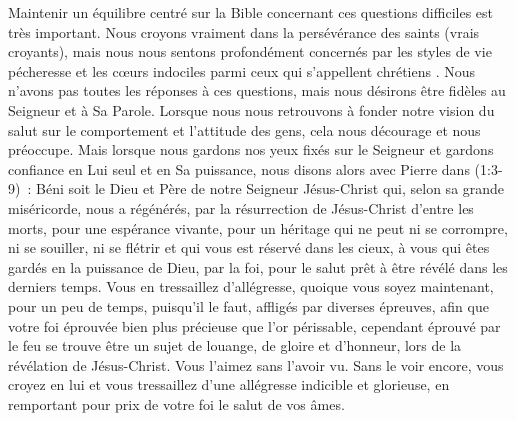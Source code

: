 \begin{enumerate}
\begin{pocketpar}{}
\begin{digestpar}{}
Maintenir un équilibre centré sur la Bible concernant ces questions difficiles est très important.
 Nous croyons vraiment dans la persévérance des saints (vrais croyants),
 mais nous nous sentons profondément concernés par les styles de vie pécheresse
 et les cœurs indociles parmi ceux qui s'appellent \og chrétiens \fg{}.
 Nous n'avons pas toutes les réponses à ces questions,
 mais nous désirons être fidèles au Seigneur et à Sa Parole.
 Lorsque nous nous retrouvons à fonder notre vision du salut
 sur le comportement et l'attitude des gens, cela nous
 décourage et nous préoccupe.
 Mais lorsque nous gardons nos yeux fixés sur le Seigneur et gardons confiance en Lui seul
 et en Sa puissance, nous disons alors avec Pierre dans
 (1:3-9)~:
 \og Béni soit le Dieu et Père de notre Seigneur Jésus-Christ qui,
 selon sa grande miséricorde, nous a régénérés, par la résurrection
 de Jésus-Christ d'entre les morts, pour une espérance vivante,
 pour un héritage qui ne peut ni se corrompre, ni se souiller,
 ni se flétrir et qui vous est réservé dans les cieux,
 à vous qui êtes gardés en la puissance de Dieu, par la foi,
 pour le salut prêt à être révélé dans les derniers temps.
 Vous en tressaillez d'allégresse, quoique vous soyez maintenant,
 pour un peu de temps, puisqu'il le faut, affligés par diverses épreuves,
 afin que votre foi éprouvée \ocadr bien plus précieuse que l'or périssable,
 cependant éprouvé par le feu \fcadr{} se trouve être un sujet de louange,
 de gloire et d'honneur, lors de la révélation de Jésus-Christ.
 Vous l'aimez sans l'avoir vu. Sans le voir encore, vous croyez en lui
 et vous tressaillez d'une allégresse indicible et glorieuse,
 en remportant pour prix de votre foi le salut de vos âmes. \fg{}
\end{digestpar}
\end{pocketpar}


\end{enumerate}

